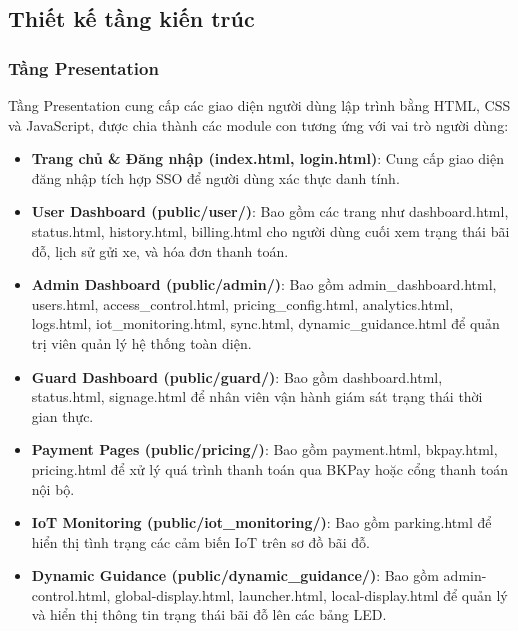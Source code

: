 \subsection{Thiết kế tầng kiến trúc}

\subsubsection{Tầng Presentation}

Tầng Presentation cung cấp các giao diện người dùng lập trình bằng HTML, CSS và JavaScript, được chia thành các module con tương ứng với vai trò người dùng:

\begin{itemize}
    \item \textbf{Trang chủ \& Đăng nhập (index.html, login.html)}: Cung cấp giao diện đăng nhập tích hợp SSO để người dùng xác thực danh tính.
    
    \item \textbf{User Dashboard (public/user/)}: Bao gồm các trang như dashboard.html, status.html, history.html, billing.html cho người dùng cuối xem trạng thái bãi đỗ, lịch sử gửi xe, và hóa đơn thanh toán.
    
    \item \textbf{Admin Dashboard (public/admin/)}: Bao gồm admin\_dashboard.html, users.html, access\_control.html, pricing\_config.html, analytics.html, logs.html, iot\_monitoring.html, sync.html, dynamic\_guidance.html để quản trị viên quản lý hệ thống toàn diện.
    
    \item \textbf{Guard Dashboard (public/guard/)}: Bao gồm dashboard.html, status.html, signage.html để nhân viên vận hành giám sát trạng thái thời gian thực.
    
    \item \textbf{Payment Pages (public/pricing/)}: Bao gồm payment.html, bkpay.html, pricing.html để xử lý quá trình thanh toán qua BKPay hoặc cổng thanh toán nội bộ.
    
    \item \textbf{IoT Monitoring (public/iot\_monitoring/)}: Bao gồm parking.html để hiển thị tình trạng các cảm biến IoT trên sơ đồ bãi đỗ.
    
    \item \textbf{Dynamic Guidance (public/dynamic\_guidance/)}: Bao gồm admin-control.html, global-display.html, launcher.html, local-display.html để quản lý và hiển thị thông tin trạng thái bãi đỗ lên các bảng LED.
\end{itemize}

